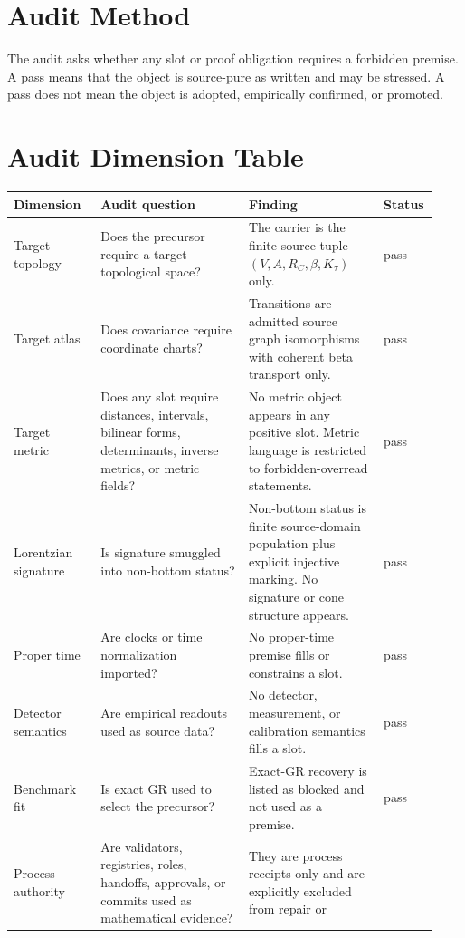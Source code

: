 \documentclass[11pt]{article}
\begin{document}
\section{Audit Method}

The audit asks whether any slot or proof obligation requires a forbidden
premise. A pass means that the object is source-pure as written and may be
stressed. A pass does not mean the object is adopted, empirically confirmed, or
promoted.

\section{Audit Dimension Table}

\begin{longtable}{p{0.20\linewidth}p{0.34\linewidth}p{0.31\linewidth}p{0.08\linewidth}}
\toprule
Dimension & Audit question & Finding & Status \\
\midrule
Target topology & Does the precursor require a target topological space? &
The carrier is the finite source tuple \((V,A,R_C,\beta,K_\tau)\) only. &
pass \\
Target atlas & Does covariance require coordinate charts? &
Transitions are admitted source graph isomorphisms with coherent beta
transport only. &
pass \\
Target metric & Does any slot require distances, intervals, bilinear forms,
determinants, inverse metrics, or metric fields? &
No metric object appears in any positive slot. Metric language is restricted
to forbidden-overread statements. &
pass \\
Lorentzian signature & Is signature smuggled into non-bottom status? &
Non-bottom status is finite source-domain population plus explicit injective
marking. No signature or cone structure appears. &
pass \\
Proper time & Are clocks or time normalization imported? &
No proper-time premise fills or constrains a slot. &
pass \\
Detector semantics & Are empirical readouts used as source data? &
No detector, measurement, or calibration semantics fills a slot. &
pass \\
Benchmark fit & Is exact GR used to select the precursor? &
Exact-GR recovery is listed as blocked and not used as a premise. &
pass \\
Process authority & Are validators, registries, roles, handoffs, approvals,
or commits used as mathematical evidence? &
They are process receipts only and are explicitly excluded from repair or

\end{longtable}
\end{document}
